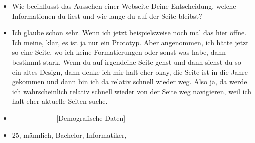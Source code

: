 {\begin{itemize}[]
            \item {} Wie beeinflusst das Aussehen einer Webseite Deine Entscheidung, welche Informationen du liest und wie lange du auf der Seite bleibst?
            \item {} Ich glaube schon sehr.
                  Wenn ich jetzt beispielsweise noch mal das hier öffne.
                  Ich meine, klar, es ist ja nur ein Prototyp.
                  Aber angenommen, ich hätte jetzt so eine Seite, wo ich keine Formatierungen oder sonst was habe, dann bestimmt stark.
                  Wenn du auf irgendeine Seite gehst und dann siehst du so ein altes Design, dann denke ich mir halt eher okay, die Seite ist in die Jahre gekommen und dann bin ich da relativ schnell wieder weg.
                  Also ja, da werde ich wahrscheinlich relativ schnell wieder von der Seite weg navigieren, weil ich halt eher aktuelle Seiten suche.
            \item {------------------} [Demografische Daten] {------------------}
            \item {} 25, männlich, Bachelor, Informatiker,
      \end{itemize}}
\nolinenumbers
